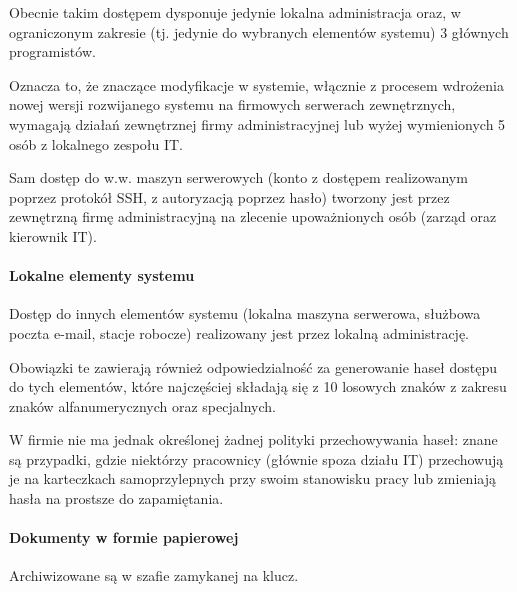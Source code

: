 \documentclass{article}
\begin{document}
            Obecnie takim dostępem dysponuje jedynie lokalna administracja oraz, w ograniczonym zakresie (tj. jedynie do wybranych elementów systemu) 3 głównych programistów.

            Oznacza to, że znaczące modyfikacje w systemie, włącznie z procesem wdrożenia nowej wersji rozwijanego systemu na firmowych serwerach zewnętrznych, wymagają działań zewnętrznej firmy administracyjnej lub wyżej wymienionych 5 osób z lokalnego zespołu IT.

            Sam dostęp do w.w. maszyn serwerowych (konto z dostępem realizowanym poprzez protokół SSH, z autoryzacją poprzez hasło) tworzony jest przez zewnętrzną firmę administracyjną na zlecenie upoważnionych osób (zarząd oraz kierownik IT).

            \paragraph{Lokalne elementy systemu}
            Dostęp do innych elementów systemu (lokalna maszyna serwerowa, służbowa poczta e-mail, stacje robocze) realizowany jest przez lokalną administrację.

            Obowiązki te zawierają również odpowiedzialność za generowanie haseł dostępu do tych elementów, które najczęściej składają się z 10 losowych znaków z zakresu znaków alfanumerycznych oraz specjalnych.

            W firmie nie ma jednak określonej żadnej polityki przechowywania haseł: znane są przypadki, gdzie niektórzy pracownicy (głównie spoza działu IT) przechowują je na karteczkach samoprzylepnych przy swoim stanowisku pracy lub zmieniają hasła na prostsze do zapamiętania.

            \paragraph{Dokumenty w formie papierowej}
            Archiwizowane są w szafie zamykanej na klucz.
\end{document}
